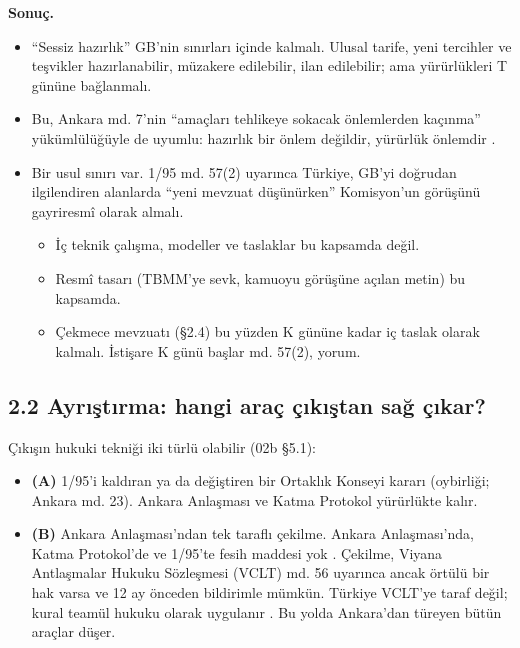 \textbf{Sonuç.}

\begin{itemize}
\tightlist
\item
  ``Sessiz hazırlık'' GB'nin sınırları içinde kalmalı. Ulusal tarife, yeni tercihler ve teşvikler hazırlanabilir, müzakere edilebilir, ilan edilebilir; ama yürürlükleri T gününe bağlanmalı.
\item
  Bu, Ankara md. 7'nin ``amaçları tehlikeye sokacak önlemlerden kaçınma'' yükümlülüğüyle de uyumlu: hazırlık bir önlem değildir, yürürlük önlemdir \etiketH{}.
\item
  Bir usul sınırı var. 1/95 md. 57(2) uyarınca Türkiye, GB'yi doğrudan ilgilendiren alanlarda ``yeni mevzuat düşünürken'' Komisyon'un görüşünü gayriresmî olarak almalı.

  \begin{itemize}
  \tightlist
  \item
    İç teknik çalışma, modeller ve taslaklar bu kapsamda değil.
  \item
    Resmî tasarı (TBMM'ye sevk, kamuoyu görüşüne açılan metin) bu kapsamda.
  \item
    Çekmece mevzuatı (§2.4) bu yüzden K gününe kadar iç taslak olarak kalmalı. İstişare K günü başlar \etiketV{} md. 57(2), \etiketH{} yorum.
  \end{itemize}
\end{itemize}

\hypertarget{02c_hazirlik-22-ayrux131ux15ftux131rma-hangi-arauxe7-uxe7ux131kux131ux15ftan-saux11f-uxe7ux131kar}{%
\subsection{2.2 Ayrıştırma: hangi araç çıkıştan sağ çıkar?}\label{02c_hazirlik-22-ayrux131ux15ftux131rma-hangi-arauxe7-uxe7ux131kux131ux15ftan-saux11f-uxe7ux131kar}}

Çıkışın hukuki tekniği iki türlü olabilir (02b §5.1):

\begin{itemize}
\tightlist
\item
  \textbf{(A)} 1/95'i kaldıran ya da değiştiren bir Ortaklık Konseyi kararı (oybirliği; Ankara md. 23). Ankara Anlaşması ve Katma Protokol yürürlükte kalır.
\item
  \textbf{(B)} Ankara Anlaşması'ndan tek taraflı çekilme. Ankara Anlaşması'nda, Katma Protokol'de ve 1/95'te fesih maddesi yok \etiketV{}. Çekilme, Viyana Antlaşmalar Hukuku Sözleşmesi (VCLT) md. 56 uyarınca ancak örtülü bir hak varsa ve 12 ay önceden bildirimle mümkün. Türkiye VCLT'ye taraf değil; kural teamül hukuku olarak uygulanır \etiketD{}. Bu yolda Ankara'dan türeyen bütün araçlar düşer.
\end{itemize}

